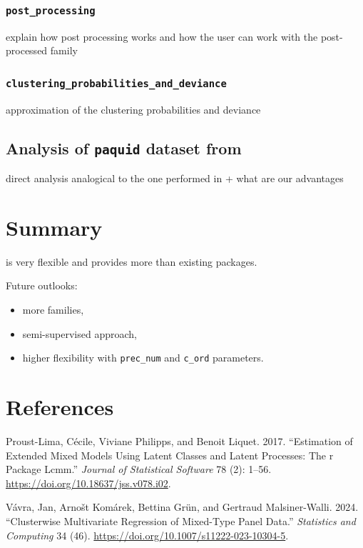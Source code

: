 \subsubsection{\texorpdfstring{\texttt{post\_processing}}{post\_processing}}\label{post_processing}

explain how post processing works and how the user can work with the post-processed family

\subsubsection{\texorpdfstring{\texttt{clustering\_probabilities\_and\_deviance}}{clustering\_probabilities\_and\_deviance}}\label{clustering_probabilities_and_deviance}

approximation of the clustering probabilities and deviance

\subsection{\texorpdfstring{Analysis of \texttt{paquid} dataset from }{Analysis of paquid dataset from }}\label{analysis-of-paquid-dataset-from}

direct analysis analogical to the one performed in  + what are our advantages

\section{Summary}\label{summary}

 is very flexible and provides more than existing packages.

Future outlooks:

\begin{itemize}
\tightlist
\item
  more families,
\item
  semi-supervised approach,
\item
  higher flexibility with \texttt{prec\_num} and \texttt{c\_ord} parameters.
\end{itemize}

\section*{References}\label{references}

\label{refs}
\begin{CSLReferences}{1}{0}
Proust-Lima, Cécile, Viviane Philipps, and Benoit Liquet. 2017. {``Estimation of Extended Mixed Models Using Latent Classes and Latent Processes: The r Package Lcmm.''} \emph{Journal of Statistical Software} 78 (2): 1--56. \url{https://doi.org/10.18637/jss.v078.i02}.

Vávra, Jan, Arnošt Komárek, Bettina Grün, and Gertraud Malsiner-Walli. 2024. {``Clusterwise Multivariate Regression of Mixed-Type Panel Data.''} \emph{Statistics and Computing} 34 (46). \url{https://doi.org/10.1007/s11222-023-10304-5}.

\end{CSLReferences}


